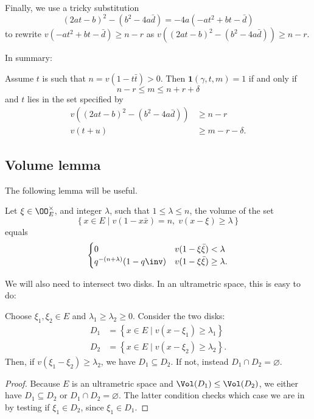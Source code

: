 Finally, we use a tricky substitution
\[ (2at-b)^2 - (b^2-4a\bar d) = -4a(-at^2+bt-\bar d) \]
to rewrite $v(-at^2+bt-\bar d) \geq n-r$
as $v\left( (2at-b)^2 - (b^2-4a\bar d) \right) \geq n-r$.

In summary:
\begin{claim}
  Assume $t$ is such that $n = v(1-t \bar t) > 0$.
  Then $\mathbf{1}(\gamma, t, m) = 1$ if and only if
  \[ n - r \leq m \leq n + r + \delta \]
  and $t$ lies in the set specified by
  \begin{align*}
    v\left( (2at-b)^2 - (b^2-4a\bar d) \right) &\geq n-r \\
    v(t+u) &\ge m-r-\delta.
  \end{align*}
\end{claim}

\subsection{Volume lemma}
The following lemma will be useful.
\begin{lemma}
  Let $\xi \in \OO_E^\times$, and integer $\lambda$, such that $1 \le \lambda \le n$,
  the volume of the set
  \[ \left\{ x \in E \mid v(1-x \bar x) = n, \; v(x-\xi) \ge \lambda \right\} \]
  equals
  \[
    \begin{cases}
      0 & v(1-\xi\bar\xi) < \lambda \\
      q^{-(n+\lambda)}(1-q\inv) & v(1-\xi\bar\xi) \ge \lambda.
    \end{cases}
  \]
\end{lemma}

We will also need to intersect two disks. In an ultrametric space, this is easy to do:
\begin{lemma}
  Choose $\xi_1, \xi_2 \in E$ and $\lambda_1 \geq \lambda_2 \geq 0$.
  Consider the two disks:
  \begin{align*}
    D_1 &= \left\{ x \in E \mid v(x-\xi_1) \ge \lambda_1 \right\} \\
    D_2 &= \left\{ x \in E \mid v(x-\xi_2) \ge \lambda_2 \right\}.
  \end{align*}
  Then, if $v(\xi_1-\xi_2) \geq \lambda_2$, we have $D_1 \subseteq D_2$.
  If not, instead $D_1 \cap D_2 = \varnothing$.
  \label{lem:mastercard}
\end{lemma}
\begin{proof}
  Because $E$ is an ultrametric space and $\Vol(D_1) \leq \Vol(D_2)$,
  we either have $D_1 \subseteq D_2$ or $D_1 \cap D_2 = \varnothing$.
  The latter condition checks which case we are in by testing if $\xi_1 \in D_2$,
  since $\xi_1 \in D_1$.
\end{proof}

